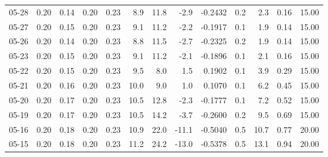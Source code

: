 \begin{threeparttable}
{\begin{tabular}{lrrrrrrrrrrrr}
  05-28 &          0.20 &          0.14 &          0.20 &        0.23 &                 8.9 &                11.8 &       -2.9 &      -0.2432 &                 0.2 &              2.3 &            0.16 &                  15.00 \\
  05-27 &          0.20 &          0.15 &          0.20 &        0.23 &                 9.1 &                11.2 &       -2.2 &      -0.1917 &                 0.1 &              1.9 &            0.14 &                  15.00 \\
  05-26 &          0.20 &          0.14 &          0.20 &        0.23 &                 8.8 &                11.5 &       -2.7 &      -0.2325 &                 0.2 &              1.9 &            0.14 &                  15.00 \\
  05-23 &          0.20 &          0.15 &          0.20 &        0.23 &                 9.1 &                11.2 &       -2.1 &      -0.1896 &                 0.1 &              2.1 &            0.16 &                  15.00 \\
  05-22 &          0.20 &          0.15 &          0.20 &        0.23 &                 9.5 &                 8.0 &        1.5 &       0.1902 &                 0.1 &              3.9 &            0.29 &                  15.00 \\
  05-21 &          0.20 &          0.16 &          0.20 &        0.23 &                10.0 &                 9.0 &        1.0 &       0.1070 &                 0.1 &              6.2 &            0.45 &                  15.00 \\
  05-20 &          0.20 &          0.17 &          0.20 &        0.23 &                10.5 &                12.8 &       -2.3 &      -0.1777 &                 0.1 &              7.2 &            0.52 &                  15.00 \\
  05-19 &          0.20 &          0.17 &          0.20 &        0.23 &                10.5 &                14.2 &       -3.7 &      -0.2600 &                 0.2 &              9.5 &            0.69 &                  15.00 \\
  05-16 &          0.20 &          0.18 &          0.20 &        0.23 &                10.9 &                22.0 &      -11.1 &      -0.5040 &                 0.5 &             10.7 &            0.77 &                  20.00 \\
  05-15 &          0.20 &          0.18 &          0.20 &        0.23 &                11.2 &                24.2 &      -13.0 &      -0.5378 &                 0.5 &             13.1 &            0.94 &                  20.00 \\

\end{tabular}}
\end{threeparttable}
